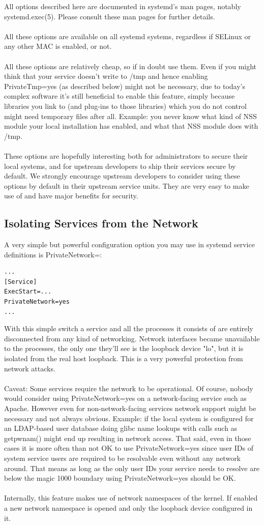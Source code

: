 \documentclass[titlepage]{article}
\begin{document}
All options described here are documented in systemd's man pages, notably systemd.exec(5). Please consult these man pages for further details.
\\
\\
All these options are available on all systemd systems, regardless if SELinux or any other MAC is enabled, or not.
\\
\\
All these options are relatively cheap, so if in doubt use them. Even if you might think that your service doesn't write to /tmp and hence enabling PrivateTmp=yes (as described below) might not be necessary, due to today's complex software it's still beneficial to enable this feature, simply because libraries you link to (and plug-ins to those libraries) which you do not control might need temporary files after all. Example: you never know what kind of NSS module your local installation has enabled, and what that NSS module does with /tmp.
\\
\\
These options are hopefully interesting both for administrators to secure their local systems, and for upstream developers to ship their services secure by default. We strongly encourage upstream developers to consider using these options by default in their upstream service units. They are very easy to make use of and have major benefits for security.
\subsection{Isolating Services from the Network}
A very simple but powerful configuration option you may use in systemd service definitions is PrivateNetwork=:
\begin{lstlisting}
...
[Service]
ExecStart=...
PrivateNetwork=yes
...
\end{lstlisting}
With this simple switch a service and all the processes it consists of are entirely disconnected from any kind of networking. Network interfaces became unavailable to the processes, the only one they'll see is the loopback device "lo", but it is isolated from the real host loopback. This is a very powerful protection from network attacks.
\\
\\
Caveat: Some services require the network to be operational. Of course, nobody would consider using PrivateNetwork=yes on a network-facing service such as Apache. However even for non-network-facing services network support might be necessary and not always obvious. Example: if the local system is configured for an LDAP-based user database doing glibc name lookups with calls such as getpwnam() might end up resulting in network access. That said, even in those cases it is more often than not OK to use PrivateNetwork=yes since user IDs of system service users are required to be resolvable even without any network around. That means as long as the only user IDs your service needs to resolve are below the magic 1000 boundary using PrivateNetwork=yes should be OK.
\\
\\
Internally, this feature makes use of network namespaces of the kernel. If enabled a new network namespace is opened and only the loopback device configured in it.
\end{document}

